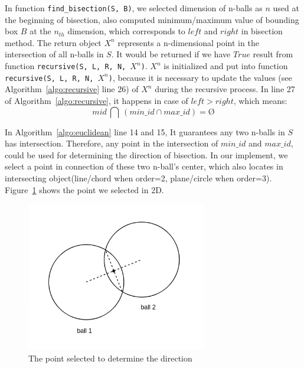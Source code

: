 In function \texttt{find\_bisection(S, B)}, we selected dimension of n-balls as
$n$ used at the beginning of bisection, also computed minimum/maximum value of
bounding box $B$ at the $n_{th}$ dimension, which corresponds to $left$ and
$right$ in bisection method. The return object $X^n$ represents a n-dimensional
point in the intersection of all n-balls in $S$. It would be returned if we have
$True$ result from function \texttt{recursive(S, L, R, N, $X^n$)}. $X^n$ is
initialized and put into function \texttt{recursive(S, L, R, N, $X^n$)}, because
it is necessary to update the values (see Algorithm~\ref{algo:recursive} line
26) of $X^n$ during the recursive process. In line 27 of
Algorithm~\ref{algo:recursive}, it happens in case of $left > right$, which
means:
\begin{equation*}
    mid \  \bigcap \  (min\_id \cap max\_id) = \text{\O}
\end{equation*}

In Algorithm~\ref{algo:euclidean} line 14 and 15, It guarantees any two n-balls
in $S$ has intersection. Therefore, any point in the intersection of $min\_id$
and $max\_id$, could be used for determining the direction of bisection. In our
implement, we select a point in connection of these two n-ball's center, which
also locates in intersecting object(line/chord when order=2, plane/circle when
order=3). Figure~\ref{fig:compare_point} shows the point we selected in 2D.

\begin{figure}
  \centering
\includegraphics[width=0.7\textwidth]{figures/point-in-chord.png}
\caption{The point selected to determine the direction}
\label{fig:compare_point}
\end{figure}



